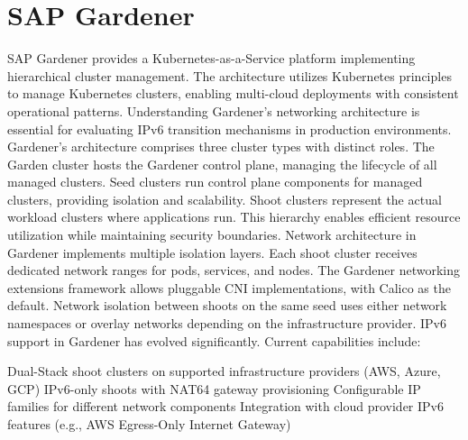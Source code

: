 \section{SAP Gardener}
SAP Gardener provides a Kubernetes-as-a-Service platform implementing hierarchical cluster management. The architecture utilizes Kubernetes principles to manage Kubernetes clusters, enabling multi-cloud deployments with consistent operational patterns. Understanding Gardener's networking architecture is essential for evaluating IPv6 transition mechanisms in production environments.
Gardener's architecture comprises three cluster types with distinct roles. The Garden cluster hosts the Gardener control plane, managing the lifecycle of all managed clusters. Seed clusters run control plane components for managed clusters, providing isolation and scalability. Shoot clusters represent the actual workload clusters where applications run. This hierarchy enables efficient resource utilization while maintaining security boundaries.
Network architecture in Gardener implements multiple isolation layers. Each shoot cluster receives dedicated network ranges for pods, services, and nodes. The Gardener networking extensions framework allows pluggable CNI implementations, with Calico as the default. Network isolation between shoots on the same seed uses either network namespaces or overlay networks depending on the infrastructure provider.
IPv6 support in Gardener has evolved significantly. Current capabilities include:

Dual-Stack shoot clusters on supported infrastructure providers (AWS, Azure, GCP)
IPv6-only shoots with NAT64 gateway provisioning
Configurable IP families for different network components
Integration with cloud provider IPv6 features (e.g., AWS Egress-Only Internet Gateway)

